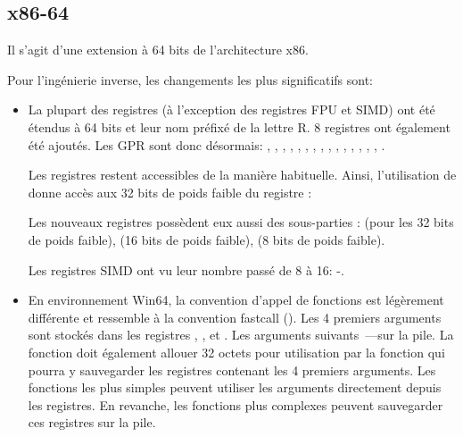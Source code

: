 
\subsection{x86-64}
\label{x86-64}

Il s'agit d'une extension à 64 bits de l'architecture x86.

Pour l'ingénierie inverse, les changements les plus significatifs sont:

\myindex{\CLanguageElements!\Pointers}
\begin{itemize}

\item

La plupart des registres (à l'exception des registres FPU et SIMD) ont été étendus à 64 bits et 
leur nom préfixé de la lettre R. 8 registres ont également été ajoutés.
Les \ac{GPR} sont donc désormais: \RAX, \RBX, \RCX, \RDX, 
\RBP, \RSP, \RSI, \RDI, , , , 
, , , , . 

Les  registres restent accessibles de la manière habituelle. Ainsi, l'utilisation de 
\EAX donne accès aux 32 bits de poids faible du registre \RAX:


Les nouveaux registres  possèdent eux aussi des sous-parties :  
(pour les 32 bits de poids faible),  (16 bits de poids faible),  
(8 bits de poids faible).


Les registres SIMD ont vu leur nombre passé de 8 à 16: -.

\item

En environnement Win64, la convention d'appel de fonctions est légèrement différente et ressemble 
à la convention fastcall ().
Les 4 premiers arguments sont stockés dans les registres \RCX, \RDX,  et . Les 
arguments suivants~---sur la pile.
La fonction  doit également allouer 32 octets pour utilisation par la fonction
 qui pourra y sauvegarder les registres contenant les 4 premiers arguments.
Les fonctions les plus simples peuvent utiliser les arguments directement depuis les registres. 
En revanche, les fonctions plus complexes peuvent sauvegarder ces registres sur la pile.


\end{itemize}
